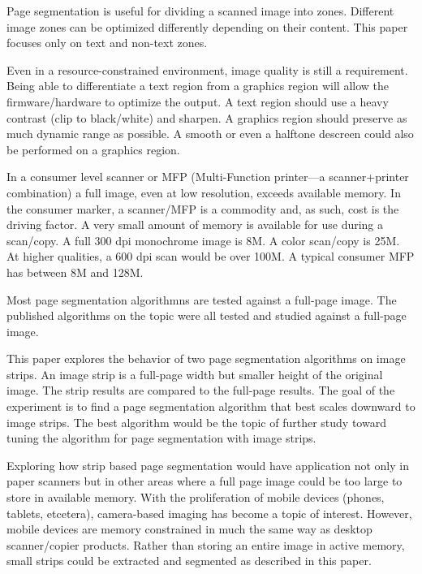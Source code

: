\documentclass[conference]{IEEEtran}
\begin{document}
Page segmentation is useful for dividing a scanned image into zones. Different
image zones can be optimized differently depending on their content. This paper
focuses only on text and non-text zones. 

Even in a resource-constrained environment, image quality is still a
requirement. Being able to differentiate a text region from a graphics region
will allow the firmware/hardware to optimize the output. A text region should
use a heavy contrast (clip to black/white) and sharpen. A graphics region
should preserve as much dynamic range as possible. A smooth or even a halftone
descreen could also be performed on a graphics region.

In a consumer level scanner or MFP (Multi-Function printer—a scanner+printer
combination) a full image, even at low resolution, exceeds available
memory. In the consumer marker, a scanner/MFP is a commodity and, as such, cost
is the driving factor. A very small amount of memory is available for use
during a scan/copy. A full 300 dpi monochrome image is 8M. A color scan/copy is
25M. At higher qualities, a 600 dpi scan would be over 100M. A typical consumer
MFP has between 8M and 128M. 

Most page segmentation algorithmns are tested against a full-page image. The
published algorithms on the topic were all tested and studied against a full-page
image.

This paper explores the behavior of two page segmentation algorithms on image
strips.  An image strip is a full-page width but smaller height of the original
image. The strip results are compared to the full-page results. The goal of the
experiment is to find a page segmentation algorithm that best scales downward
to image strips. The best algorithm would be the topic of further study toward
tuning the algorithm for page segmentation with image strips.

Exploring how strip based page segmentation would have application not only in
paper scanners but in other areas where a full page image could be too large to
store in available memory. With the proliferation of mobile devices (phones,
tablets, etcetera), camera-based imaging has become a topic of interest.
However, mobile devices are memory constrained in much the same way as desktop
scanner/copier products. Rather than storing an entire image in active memory,
small strips could be extracted and segmented as described in this paper.


%
%
\end{document}
